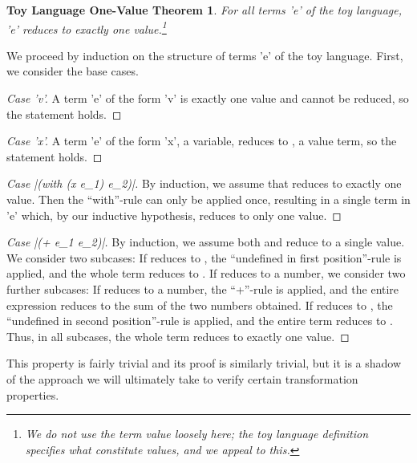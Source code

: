 \documentclass[ms,electronic,twosidetoc,letterpaper,chaptercenter,parttop]{byumsphd}
\begin{document}
\newtheorem*{toythm}{Toy Language One-Value Theorem}
\begin{toythm}
For all terms \scheme'e' of the toy language, \scheme'e' reduces to exactly one
value.\footnote{We do not use the term \emph{value} loosely here; the toy language
definition specifies what constitute values, and we appeal to this.}
\end{toythm}
We proceed by induction on the structure of terms \scheme'e' of the toy language. First,
we consider the base cases.
\begin{proof}[Case \scheme'v']
A term \scheme'e' of the form \scheme'v' is exactly one value and cannot be reduced, 
so the statement holds.
\end{proof}
\begin{proof}[Case \scheme'x']
A term \scheme'e' of the form \scheme'x', a variable, reduces to , 
a value term, so the statement holds.
\end{proof}
\begin{proof}[Case \scheme|(with (x e_1) e_2)|]
By induction, we assume that  reduces to exactly one value. Then the
``with''-rule can only be applied once, resulting in a single term  in
\scheme'e' which, by our inductive hypothesis, reduces to only one value.
\end{proof}
\begin{proof}[Case \scheme|(+ e_1 e_2)|]
By induction, we assume both  and  reduce to a single value. We
consider two subcases: If  reduces to , the ``undefined in
first position''-rule is applied, and the whole term reduces to . If
 reduces to a number, we consider two further subcases: If 
reduces to a number, the ``+''-rule is applied, and the entire expression reduces to the
sum of the two numbers obtained. If  reduces to , the
``undefined in second position''-rule is applied, and the entire term reduces to
. Thus, in all subcases, the whole term reduces to exactly one value.
\end{proof}

This property is fairly trivial and its proof is similarly trivial, but it is a shadow of 
the approach we will ultimately take to verify certain transformation properties.

\setspecialsymbol{-->}{$\rightarrow$}
\end{document}
